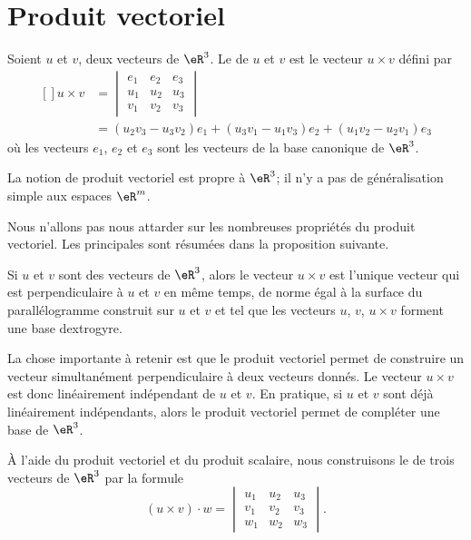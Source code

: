 \section{Produit vectoriel}

\begin{definition}
	Soient $u$ et $v$, deux vecteurs de $\eR^3$. Le  de $u$ et $v$ est le vecteur $u\times v$ défini par 
	\begin{equation}
		\begin{aligned}[]
		u\times v&=\begin{vmatrix}
			e_1	&	e_2	&	e_3	\\
			u_1	&	u_2	&	u_3	\\
			v_1	&	v_2	&	v_3
		\end{vmatrix}\\
		&=
		(u_2v_3-u_3v_2)e_1+(u_3v_1-u_1v_3)e_2+(u_1v_2-u_2v_1)e_3
		\end{aligned}
	\end{equation}
	où les vecteurs $e_1$, $e_2$ et $e_3$ sont les vecteurs de la base canonique de $\eR^3$.
\end{definition}
La notion de produit vectoriel est propre à $\eR^3$; il n'y a pas de généralisation simple aux espaces $\eR^m$.

Nous n'allons pas nous attarder sur les nombreuses propriétés du produit vectoriel. Les principales sont résumées dans la proposition suivante.
\begin{proposition}
	Si $u$ et $v$ sont des vecteurs de $\eR^3$, alors le vecteur $u\times v$ est l'unique vecteur qui est perpendiculaire à $u$ et $v$ en même temps, de norme égal à la surface du parallélogramme construit sur $u$ et $v$ et tel que les vecteurs $u$, $v$, $u\times v$ forment une base dextrogyre.
\end{proposition}
La chose importante à retenir est que le produit vectoriel permet de construire un vecteur simultanément perpendiculaire à deux vecteurs donnés. Le vecteur $u\times v$ est donc linéairement indépendant de $u$ et $v$. En pratique, si $u$ et $v$ sont déjà linéairement indépendants, alors le produit vectoriel permet de compléter une base de $\eR^3$.

À l'aide du produit vectoriel et du produit scalaire, nous construisons le  de trois vecteurs de $\eR^3$ par la formule
\begin{equation}
	(u\times v)\cdot w=\begin{vmatrix}
			u_1	&	u_2	&	u_3	\\
			v_1	&	v_2	&	v_3	\\
			w_1	&	w_2	&	w_3	
	\end{vmatrix}.
\end{equation}

